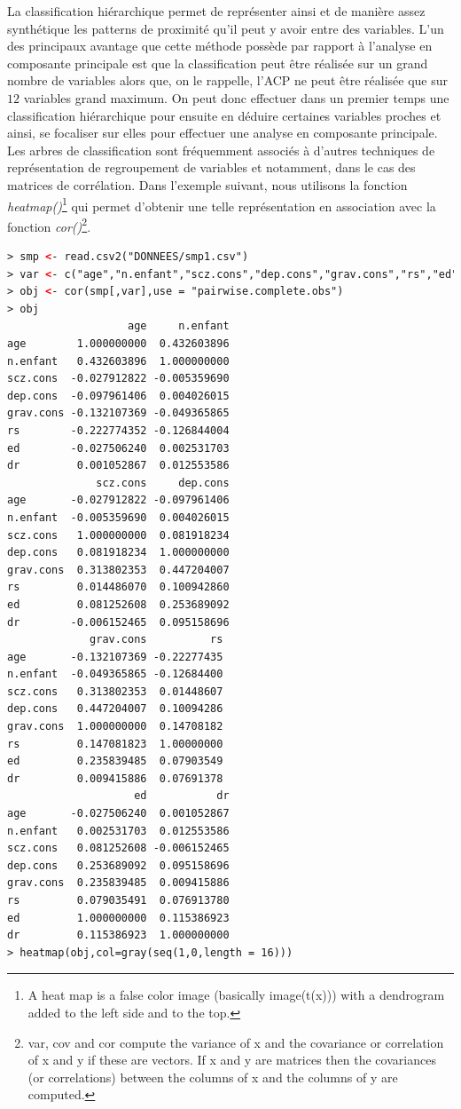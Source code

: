 La classification hiérarchique permet de représenter ainsi et de manière assez synthétique les patterns de proximité qu'il peut y avoir entre des variables. L'un des principaux avantage que cette méthode possède par rapport à l'analyse en composante principale est que la classification peut être réalisée sur un grand nombre de variables alors que, on le rappelle, l'ACP ne peut être réalisée que sur $12$ variables grand maximum. On peut donc effectuer dans un premier temps une classification hiérarchique pour ensuite en déduire certaines variables proches et ainsi, se focaliser sur elles pour effectuer une analyse en composante principale.\newline
Les arbres de classification sont fréquemment associés à d'autres techniques de représentation de regroupement de variables et notamment, dans le cas des matrices de corrélation.\newline
Dans l'exemple suivant, nous utilisons la fonction \textit{heatmap()}\footnote{A heat map is a false color image (basically image(t(x))) with a dendrogram added to the left side and to the top.} qui permet d'obtenir une telle représentation en association avec la fonction \textit{cor()}\footnote{var, cov and cor compute the variance of x and the covariance or correlation of x and y if these are vectors. If x and y are matrices then the covariances (or correlations) between the columns of x and the columns of y are computed.}.
\begin{lstlisting}[language=html]
> smp <- read.csv2("DONNEES/smp1.csv")
> var <- c("age","n.enfant","scz.cons","dep.cons","grav.cons","rs","ed","dr")
> obj <- cor(smp[,var],use = "pairwise.complete.obs")
> obj
                   age     n.enfant
age        1.000000000  0.432603896
n.enfant   0.432603896  1.000000000
scz.cons  -0.027912822 -0.005359690
dep.cons  -0.097961406  0.004026015
grav.cons -0.132107369 -0.049365865
rs        -0.222774352 -0.126844004
ed        -0.027506240  0.002531703
dr         0.001052867  0.012553586
              scz.cons     dep.cons
age       -0.027912822 -0.097961406
n.enfant  -0.005359690  0.004026015
scz.cons   1.000000000  0.081918234
dep.cons   0.081918234  1.000000000
grav.cons  0.313802353  0.447204007
rs         0.014486070  0.100942860
ed         0.081252608  0.253689092
dr        -0.006152465  0.095158696
             grav.cons          rs
age       -0.132107369 -0.22277435
n.enfant  -0.049365865 -0.12684400
scz.cons   0.313802353  0.01448607
dep.cons   0.447204007  0.10094286
grav.cons  1.000000000  0.14708182
rs         0.147081823  1.00000000
ed         0.235839485  0.07903549
dr         0.009415886  0.07691378
                    ed           dr
age       -0.027506240  0.001052867
n.enfant   0.002531703  0.012553586
scz.cons   0.081252608 -0.006152465
dep.cons   0.253689092  0.095158696
grav.cons  0.235839485  0.009415886
rs         0.079035491  0.076913780
ed         1.000000000  0.115386923
dr         0.115386923  1.000000000
> heatmap(obj,col=gray(seq(1,0,length = 16)))
\end{lstlisting}

